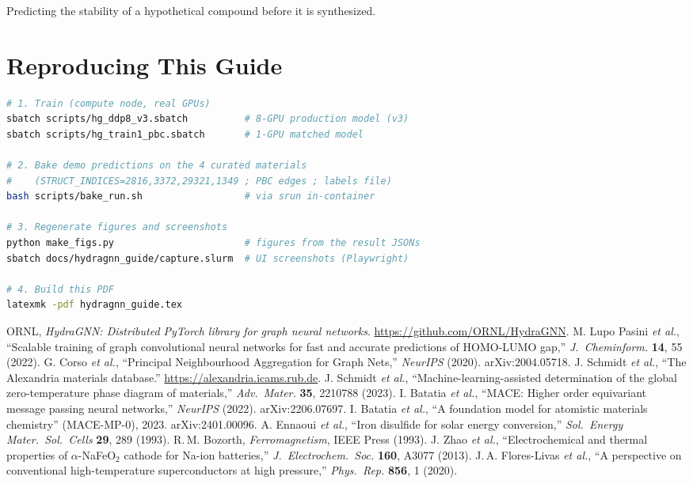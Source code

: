 \documentclass[11pt]{article}
\begin{document}
{Predicting the stability of a hypothetical compound before it is synthesized.}

\section{Reproducing This Guide}

\begin{lstlisting}[language=bash]
# 1. Train (compute node, real GPUs)
sbatch scripts/hg_ddp8_v3.sbatch          # 8-GPU production model (v3)
sbatch scripts/hg_train1_pbc.sbatch       # 1-GPU matched model

# 2. Bake demo predictions on the 4 curated materials
#    (STRUCT_INDICES=2816,3372,29321,1349 ; PBC edges ; labels file)
bash scripts/bake_run.sh                  # via srun in-container

# 3. Regenerate figures and screenshots
python make_figs.py                       # figures from the result JSONs
sbatch docs/hydragnn_guide/capture.slurm  # UI screenshots (Playwright)

# 4. Build this PDF
latexmk -pdf hydragnn_guide.tex
\end{lstlisting}

\begin{thebibliography}{9}
\small
{} ORNL, \emph{HydraGNN: Distributed PyTorch library for
graph neural networks}. \url{https://github.com/ORNL/HydraGNN}.
 M. Lupo Pasini \emph{et al.}, ``Scalable training of
graph convolutional neural networks for fast and accurate predictions of
HOMO-LUMO gap,'' \emph{J.\ Cheminform.} \textbf{14}, 55 (2022).
 G. Corso \emph{et al.}, ``Principal Neighbourhood Aggregation for
Graph Nets,'' \emph{NeurIPS} (2020). arXiv:2004.05718.
 J. Schmidt \emph{et al.}, ``The Alexandria materials
database.'' \url{https://alexandria.icams.rub.de}.
 J. Schmidt \emph{et al.}, ``Machine-learning-assisted
determination of the global zero-temperature phase diagram of materials,''
\emph{Adv.\ Mater.} \textbf{35}, 2210788 (2023).
 I. Batatia \emph{et al.}, ``MACE: Higher order equivariant
message passing neural networks,'' \emph{NeurIPS} (2022). arXiv:2206.07697.
 I. Batatia \emph{et al.}, ``A foundation model for atomistic
materials chemistry'' (MACE-MP-0), 2023. arXiv:2401.00096.
 A. Ennaoui \emph{et al.}, ``Iron disulfide for solar energy
conversion,'' \emph{Sol.\ Energy Mater.\ Sol.\ Cells} \textbf{29}, 289 (1993).
 R.\,M. Bozorth, \emph{Ferromagnetism}, IEEE Press (1993).
 J. Zhao \emph{et al.}, ``Electrochemical and thermal properties
of $\alpha$-NaFeO$_2$ cathode for Na-ion batteries,'' \emph{J.\ Electrochem.\
Soc.} \textbf{160}, A3077 (2013).
 J.\,A. Flores-Livas \emph{et al.}, ``A perspective on
conventional high-temperature superconductors at high pressure,'' \emph{Phys.\
Rep.} \textbf{856}, 1 (2020).
\end{thebibliography}
\end{document}
